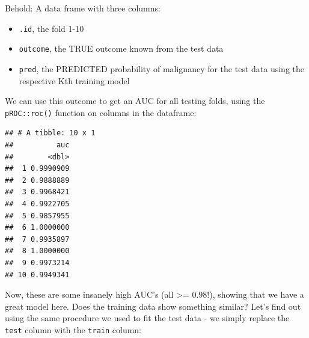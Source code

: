 \documentclass[]{article}
\newenvironment{Shaded}{\begin{snugshade}}{\end{snugshade}}
\newcommand{\KeywordTok}[1]{\textcolor[rgb]{0.13,0.29,0.53}{\textbf{#1}}}
\newcommand{\DataTypeTok}[1]{\textcolor[rgb]{0.13,0.29,0.53}{#1}}
\newcommand{\StringTok}[1]{\textcolor[rgb]{0.31,0.60,0.02}{#1}}
\newcommand{\OperatorTok}[1]{\textcolor[rgb]{0.81,0.36,0.00}{\textbf{#1}}}
\newcommand{\NormalTok}[1]{#1}
\providecommand{\tightlist}{%
  \setlength{\itemsep}{0pt}\setlength{\parskip}{0pt}}
\begin{document}
Behold: A data frame with three columns:

\begin{itemize}
\tightlist
\item
  \texttt{.id}, the fold 1-10
\item
  \texttt{outcome}, the TRUE outcome known from the test data
\item
  \texttt{pred}, the PREDICTED probability of malignancy for the test
  data using the respective Kth training model
\end{itemize}

We can use this outcome to get an AUC for all testing folds, using the
\texttt{pROC::roc()} function on columns in the dataframe:

\begin{Shaded}
\end{Shaded}

\begin{verbatim}
## # A tibble: 10 x 1
##          auc
##        <dbl>
##  1 0.9990909
##  2 0.9888889
##  3 0.9968421
##  4 0.9922705
##  5 0.9857955
##  6 1.0000000
##  7 0.9935897
##  8 1.0000000
##  9 0.9973214
## 10 0.9949341
\end{verbatim}

Now, these are some insanely high AUC's (all \textgreater{}= 0.98!),
showing that we have a great model here. Does the training data show
something similar? Let's find out using the same procedure we used to
fit the test data - we simply replace the \texttt{test} column with the
\texttt{train} column:
\end{document}
